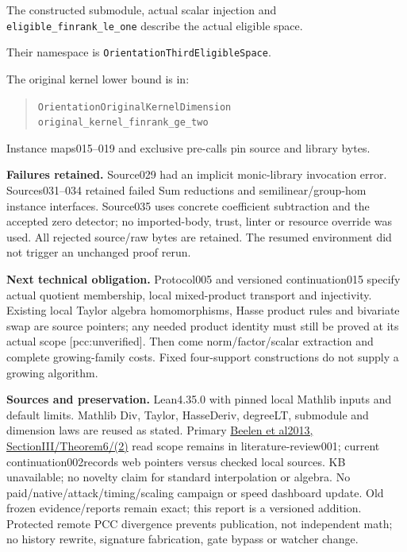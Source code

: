 \documentclass[10pt]{article}
\begin{document}
The constructed submodule, actual scalar injection and
\texttt{eligible\_finrank\_le\_one} describe the actual eligible space.

Their namespace is \texttt{OrientationThirdEligibleSpace}.

The original kernel lower bound is in:
\begin{quote}\small
\texttt{OrientationOriginalKernelDimension}\\
\texttt{original\_kernel\_finrank\_ge\_two}
\end{quote}
Instance maps015--019 and exclusive pre-calls pin source and library bytes.

\textbf{Failures retained.}
Source029 had an implicit monic-library invocation error.
Sources031--034 retained failed Sum reductions and semilinear/group-hom
instance interfaces. Source035 uses concrete coefficient subtraction and
the accepted zero detector; no imported-body, trust, linter or resource
override was used. All rejected source/raw bytes are retained.
The resumed environment did not trigger an unchanged proof rerun.

\textbf{Next technical obligation.}
Protocol005 and versioned continuation015 specify actual quotient membership,
local mixed-product transport and injectivity. Existing local Taylor algebra
homomorphisms, Hasse product rules and bivariate swap are source pointers;
any needed product identity must still be proved at its actual scope [pcc:unverified].
Then come norm/factor/scalar extraction and complete growing-family costs.
Fixed four-support constructions do not supply a growing algorithm.

\textbf{Sources and preservation.}
Lean4.35.0 with pinned local Mathlib inputs and default limits.
Mathlib Div, Taylor, HasseDeriv, degreeLT, submodule and dimension laws are
reused as stated. Primary
\href{https://doi.org/10.1109/TIT.2013.2243800}{Beelen et al2013, SectionIII/Theorem6/(2)}
read scope remains in literature-review001; current continuation002records
web pointers versus checked local sources. KB unavailable; no novelty claim
for standard interpolation or algebra.
No paid/native/attack/timing/scaling campaign or speed dashboard update.
Old frozen evidence/reports remain exact; this report is a versioned addition.
Protected remote PCC divergence prevents publication, not independent math;
no history rewrite, signature fabrication, gate bypass or watcher change.
\end{document}
